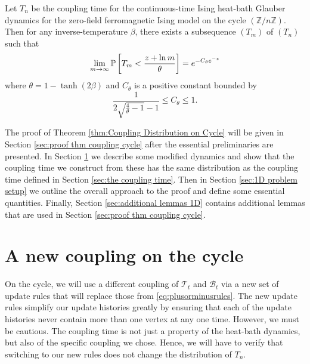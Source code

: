 

	\begin{theorem}
	\label{thm:Coupling Distribution on Cycle}
		Let $T_n$ be the coupling time for the continuous-time Ising heat-bath Glauber dynamics for the zero-field ferromagnetic Ising model on the cycle $(\mathbb{Z} / n\mathbb{Z})$. Then for any inverse-temperature $\beta$, there exists a subsequence $(T_m)$ of $(T_n)$ such that
		\begin{equation}
			\lim_{m \rightarrow \infty} \mathbb{P}\left[T_m < \frac{z + \ln m}{\theta}\right] = e^{-C_\theta e^{-z}}
		\end{equation}
		where $\theta = 1 - \tanh(2\beta)$ and $C_\theta$ is a positive constant bounded by
		\begin{equation}
			\frac{1}{2\sqrt{\frac{4}{\theta} - 1} - 1} \leq C_\theta \leq 1.
		\end{equation}
	\end{theorem}

	The proof of Theorem \ref{thm:Coupling Distribution on Cycle} will be given in Section \ref{sec:proof thm coupling cycle} after the essential preliminaries are presented. In Section \ref{sec:information percolation on the cycle} we describe some modified dynamics and show that the coupling time we construct from these has the same distribution as the coupling time defined in Section \ref{sec:the coupling time}. Then in Section \ref{sec:1D problem setup} we outline the overall approach to the proof and define some essential quantities. Finally, Section \ref{sec:additional lemmas 1D} contains additional lemmas that are used in Section \ref{sec:proof thm coupling cycle}.

	\section{A new coupling on the cycle}
	\label{sec:information percolation on the cycle}

	On the cycle, we will use a different coupling of $\mathscr{T}_t$ and $\mathscr{B}_t$ via a new set of update rules that will replace those from \eqref{eq:plusorminusrules}. The new update rules simplify our update histories greatly by ensuring that each of the update histories never contain more than one vertex at any one time. However, we must be cautious. The coupling time is not just a property of the heat-bath dynamics, but also of the specific coupling we chose. Hence, we will have to verify that switching to our new rules does not change the distribution of $T_n$. 

